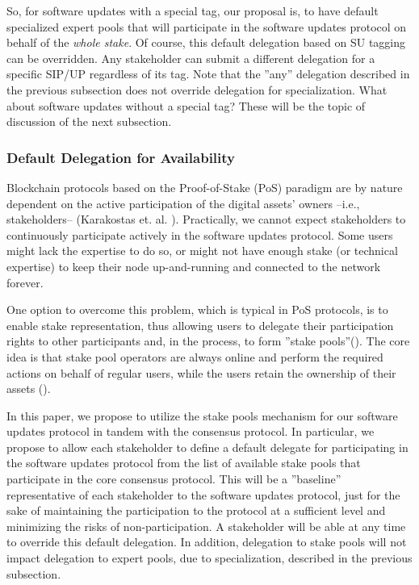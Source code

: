 So, for software updates with a special tag, our proposal is, to have default specialized expert pools that will participate in the software updates protocol on behalf of the \emph{whole stake}. Of course, this default delegation based on SU tagging can be overridden. Any stakeholder can submit a different delegation for a specific SIP/UP regardless of its tag. Note that the ''any'' delegation described in the previous subsection does not override delegation for specialization. What about software updates without a special tag? These will be the topic of discussion of the next subsection.

\subsubsection{Default Delegation for Availability}

Blockchain protocols based on the Proof-of-Stake (PoS) paradigm are by nature dependent on the active participation of the digital assets' owners --i.e., stakeholders-- (Karakostas et. al. \citep{stakepools}). Practically, we cannot expect stakeholders to continuously participate actively in the software updates protocol. Some users might lack the expertise to do so, or might not have enough stake (or technical expertise) to keep their node up-and-running and connected to the network forever.

One option to overcome this problem, which is typical in PoS protocols, is to enable stake representation, thus allowing users to delegate their participation rights to other participants and, in the process, to form
''stake pools''(\cite{stakepools)}). The core idea is that stake pool operators are always online and perform
the required actions on behalf of regular users, while the users retain the ownership of their
assets (\cite{stakepools}). 

In this paper, we propose to utilize the stake pools mechanism for our software updates protocol in tandem with the consensus protocol. In particular, we propose to allow each stakeholder to define a default delegate for participating in the software updates protocol from the list of available stake pools that participate in the core consensus protocol. This will be a ''baseline'' representative of each stakeholder to the software updates protocol, just for the sake of maintaining the participation to the protocol at a sufficient level and minimizing the risks of non-participation. A stakeholder will be able at any time to override this default delegation. In addition, delegation to stake pools will not impact delegation to expert pools, due to specialization, described in the previous subsection.

